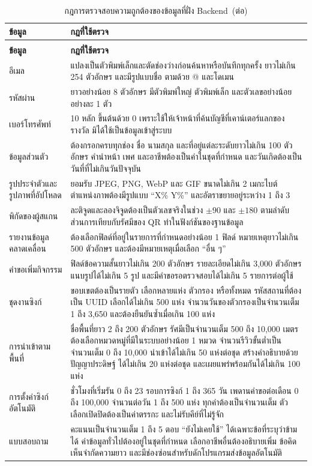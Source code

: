 \nopagebreak
\begin{longtable}{|p{3.4cm}|p{9.3cm}|}
\caption{กฎการตรวจสอบความถูกต้องของข้อมูลที่ฝั่ง Backend}\label{tab:validation_rules}\\
\hline
\textbf{ข้อมูล} & \textbf{กฎที่ใช้ตรวจ} \\
\hline
\endfirsthead
\caption[]{กฎการตรวจสอบความถูกต้องของข้อมูลที่ฝั่ง Backend~(\textnormal{ต่อ})}\\
\hline
\textbf{ข้อมูล} & \textbf{กฎที่ใช้ตรวจ} \\
\hline
\endhead
อีเมล & แปลงเป็นตัวพิมพ์เล็กและตัดช่องว่างก่อนค้นหาหรือบันทึกทุกครั้ง ยาวไม่เกิน 254 ตัวอักษร และมีรูปแบบชื่อ ตามด้วย @ และโดเมน \\ \hline
รหัสผ่าน & ยาวอย่างน้อย 8 ตัวอักษร มีตัวพิมพ์ใหญ่ ตัวพิมพ์เล็ก และตัวเลขอย่างน้อยอย่างละ 1 ตัว \\ \hline
เบอร์โทรศัพท์ & 10 หลัก ขึ้นต้นด้วย 0 เพราะใช้ให้เจ้าหน้าที่ค้นบัญชีที่เคาน์เตอร์แลกของรางวัล มิได้ใช้เป็นข้อมูลเข้าสู่ระบบ \\ \hline
ข้อมูลส่วนตัว & ต้องกรอกครบทุกช่อง ชื่อ นามสกุล และที่อยู่แต่ละระดับยาวไม่เกิน 100 ตัวอักษร คำนำหน้า เพศ และอาชีพต้องเป็นค่าในชุดที่กำหนด และวันเกิดต้องเป็นวันที่ที่ไม่เกินวันปัจจุบัน \\ \hline
รูปประจำตัวและรูปภาพที่อัปโหลด & ยอมรับ JPEG, PNG, WebP และ GIF ขนาดไม่เกิน 2 เมกะไบต์ ตำแหน่งภาพต้องมีรูปแบบ ``X\% Y\%'' และอัตราขยายอยู่ระหว่าง 1 ถึง 3 \\ \hline
พิกัดของผู้สแกน & ละติจูดและลองจิจูดต้องเป็นตัวเลขจริงในช่วง $\pm 90$ และ $\pm 180$ ตามลำดับ ส่วนการเทียบกับรัศมีของ QR ทำในฟังก์ชันของฐานข้อมูล \\ \hline
รายงานข้อมูลคลาดเคลื่อน & ต้องเลือกฟิลด์ที่อยู่ในรายการที่กำหนดอย่างน้อย 1 ฟิลด์ หมายเหตุยาวไม่เกิน 500 ตัวอักษร และต้องมีหมายเหตุเมื่อเลือก ``อื่น ๆ'' \\ \hline
คำขอเพิ่มกิจกรรม & ฟิลด์ข้อความสั้นยาวไม่เกิน 200 ตัวอักษร รายละเอียดไม่เกิน 3,000 ตัวอักษร แนบรูปได้ไม่เกิน 5 รูป และมีคำขอรอตรวจสอบได้ไม่เกิน 5 รายการต่อผู้ใช้ \\ \hline
ชุดงานซิงก์ & ขอบเขตต้องเป็นรายตัว เลือกหลายแห่ง ตัวกรอง หรือทั้งหมด รหัสสถานที่ต้องเป็น UUID เลือกได้ไม่เกิน 500 แห่ง จำนวนวันของตัวกรองเป็นจำนวนเต็ม 1 ถึง 3,650 และต้องยืนยันซ้ำเมื่อเกิน 100 แห่ง \\ \hline
การนำเข้าตามพื้นที่ & ชื่อพื้นที่ยาว 2 ถึง 200 ตัวอักษร รัศมีเป็นจำนวนเต็ม 500 ถึง 10,000 เมตร ต้องเลือกหมวดหมู่ที่มีในระบบอย่างน้อย 1 หมวด จำนวนรีวิวขั้นต่ำเป็นจำนวนเต็ม 0 ถึง 10,000 นำเข้าได้ไม่เกิน 50 แห่งต่อชุด สร้างคำอธิบายด้วยปัญญาประดิษฐ์ ได้ไม่เกิน 20 แห่งต่อชุด และเผยแพร่พร้อมกันได้ไม่เกิน 100 แห่ง \\ \hline
การตั้งค่าซิงก์อัตโนมัติ & ชั่วโมงที่เริ่มรัน 0 ถึง 23 รอบการซิงก์ 1 ถึง 365 วัน เพดานคำขอต่อเดือน 0 ถึง 100,000 จำนวนต่อวัน 1 ถึง 500 แห่ง ทุกค่าต้องเป็นจำนวนเต็ม ตัวเลือกเปิดปิดต้องเป็นค่าตรรกะ และไม่รับคีย์ที่ไม่รู้จัก \\ \hline
แบบสอบถาม & คะแนนเป็นจำนวนเต็ม 1 ถึง 5 ตอบ ``ยังไม่เคยใช้'' ได้เฉพาะข้อที่ระบุว่าข้ามได้ ค่าข้อมูลทั่วไปต้องอยู่ในชุดที่กำหนด เลือกอาชีพอื่นต้องอธิบายเพิ่ม ข้อคิดเห็นจำกัดความยาว และมีช่องซ่อนสำหรับดักโปรแกรมส่งข้อมูลอัตโนมัติ \\
\hline
\end{longtable}


